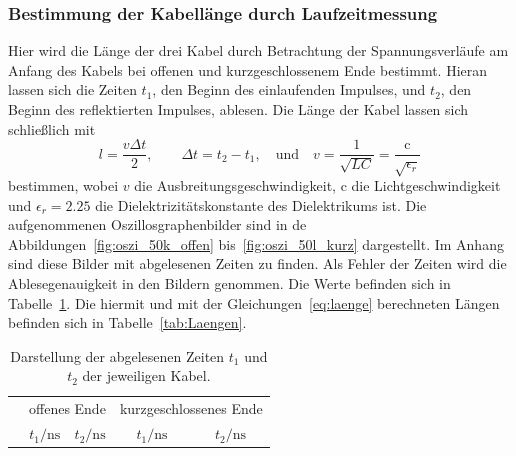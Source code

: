 
\subsubsection{Bestimmung der Kabellänge durch Laufzeitmessung}
\label{ssub:bestimmung_der_kabell_nge_durch_laufzeitmessung}

Hier wird die Länge der drei Kabel durch Betrachtung der Spannungsverläufe am
Anfang des Kabels bei offenen und kurzgeschlossenem Ende bestimmt. Hieran
lassen sich die Zeiten $t_1$, den Beginn des einlaufenden Impulses, und $t_2$,
den Beginn des reflektierten Impulses, ablesen. Die Länge der Kabel lassen sich
schließlich mit%
\begin{equation}
  l = \frac{v \Delta t}{2}, \qquad \Delta t = t_2 - t_1, \quad \text{und} \quad
  v = \frac{1}{\sqrt{LC}} = \frac{\text{c}}{\sqrt{\epsilon_r}}
  \label{eq:laenge}
\end{equation}
bestimmen, wobei $v$ die Ausbreitungsgeschwindigkeit,
$\text{c}$ die Lichtgeschwindigkeit und $\epsilon_r = 2.25$
die Dielektrizitätskonstante des Dielektrikums ist.
Die aufgenommenen Oszillosgraphenbilder sind in de
Abbildungen~\ref{fig:oszi_50k_offen} bis~\ref{fig:oszi_50l_kurz} dargestellt.
Im Anhang sind diese Bilder mit abgelesenen Zeiten zu finden.
Als Fehler der Zeiten wird die Ablesegenauigkeit in den Bildern
genommen. Die Werte befinden sich in Tabelle~\ref{tab:Zeiten}.
Die hiermit und mit der Gleichungen~\eqref{eq:laenge} berechneten Längen
befinden sich in Tabelle~\ref{tab:Laengen}.

\begin{table}[hb]
  \centering
  \begin{tabular}{lcccc}
    \midrule
    \midrule
    & \multicolumn{2}{c}{offenes Ende} &
    \multicolumn{2}{c}{kurzgeschlossenes Ende} \\
    \cmidrule(lr{0.75em}){2-5}
    & $t_1 / \si{\nano\second}$ & $t_2 / \si{\nano\second}$    &
    $t_1 / \si{\nano\second}$ & $t_2 / \si{\nano\second}$ \\
    \midrule
    
    \midrule
    \midrule
  \end{tabular}
  \caption{Darstellung der abgelesenen Zeiten $t_1$ und $t_2$ der
  jeweiligen Kabel.}
  \vspace{2em}
  \label{tab:Zeiten}
\end{table}

